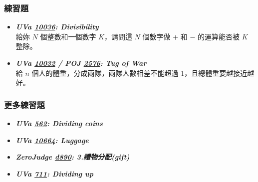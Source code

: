 \subsubsection*{練習題}
\begin{itemize}[label={\Checkmark}]
\item \textbf{\textit{UVa \href{http://uva.onlinejudge.org/external/100/10036.html}{10036}: Divisibility}}\\
給妳 $N$ 個整數和一個數字 $K$，請問這 $N$ 個數字做 $+$ 和 $-$ 的運算能否被 $K$ 整除。
\item \textbf{\textit{UVa \href{http://uva.onlinejudge.org/external/100/10032.html}{10032} / POJ \href{http://poj.org/problem?id=2576}{2576}: Tug of War}}\\
給 $n$ 個人的體重，分成兩隊，兩隊人數相差不能超過 $1$，且總體重要越接近越好。
\end{itemize}
\subsubsection*{更多練習題}
\begin{itemize}[label={\PencilLeftDown}]
\item \textbf{\textit{UVa \href{http://uva.onlinejudge.org/external/5/562.html}{562}: Dividing coins}}
\item \textbf{\textit{UVa \href{http://uva.onlinejudge.org/external/106/10664.html}{10664}: Luggage}}
\item \textbf{\textit{ZeroJudge \href{http://zerojudge.tw/ShowProblem?problemid=d890}{d890}: 3.禮物分配(gift)}}
\item \textbf{\textit{UVa \href{http://uva.onlinejudge.org/external/7/711.html}{711}: Dividing up}}
\end{itemize}